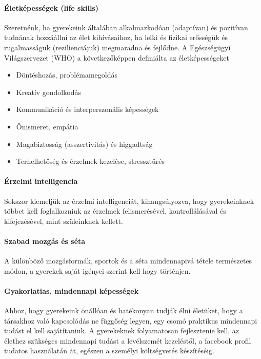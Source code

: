 \paragraph{Életképességek (life skills)}

Szeretnénk, ha gyerekeink általában alkalmazkodóan (adaptívan) és pozitívan tudnának hozzáállni az élet kihívásaihoz, ha lelki és fizikai erősségük és rugalmasságuk (rezilienciájuk) megmaradna és fejlődne.   A Egészségügyi Világszervezet (WHO) a következőképpen definiálta \citep{oecd99lifeskills} az életképességeket
\begin{itemize}
\item Döntéshozás, problémamegoldás

\item Kreatív gondolkodás

\item Kommunikáció és interperszonális képességek

\item Önismeret, empátia

\item Magabiztosság (asszertivitás) és higgadtság

\item Terhelhetőség és érzelmek kezelése, stressztűrés
\end{itemize}
\paragraph{Érzelmi intelligencia}

Sokszor kiemeljük az érzelmi intelligenciát, kihangsúlyozva, hogy gyerekeinknek többet kell foglalkozniuk az érzelmek felismerésével, kontrollálásával és kifejezésével, mint szüleinknek kellett.

\paragraph{Szabad mozgás és séta}

A különböző mozgásformák, sportok és a séta mindennapivá tétele természetes módon, a gyerekek saját igényei szerint kell hogy történjen.

\paragraph{Gyakorlatias, mindennapi képességek}

Ahhoz, hogy gyerekeink önállóan és hatékonyan tudják élni életüket, hogy a társakhoz való kapcsolódás ne függőség legyen, egy csomó praktikus mindennapi tudást el kell sajátítaniuk. A gyerekeknek folyamatosan fejlesztenie kell, az élethez szükséges mindennapi tudást a levélszemét kezeléstől, a facebook profil tudatos használatán át, egészen a személyi költségvetés készítéséig.

